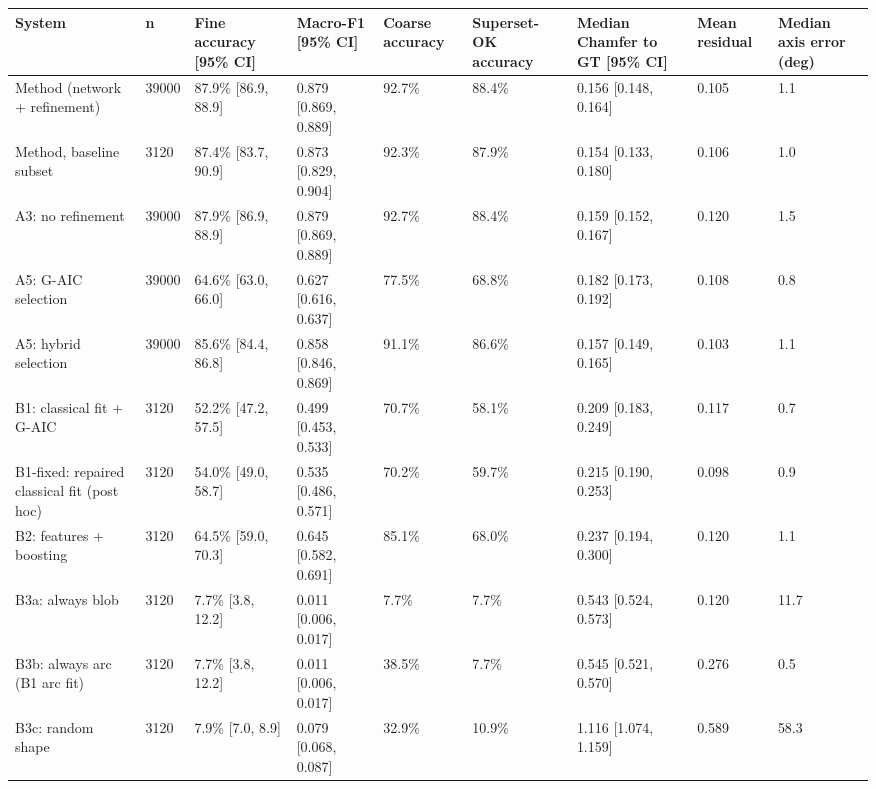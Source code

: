 \scriptsize
\begin{tabular}{lllllllll}
\toprule
\textbf{System} & \textbf{n} & \textbf{Fine accuracy [95\% CI]} & \textbf{Macro-F1 [95\% CI]} & \textbf{Coarse accuracy} & \textbf{Superset-OK accuracy} & \textbf{Median Chamfer to GT [95\% CI]} & \textbf{Mean residual} & \textbf{Median axis error (deg)} \\
\midrule
Method (network + refinement) & 39000 & 87.9\% [86.9, 88.9] & 0.879 [0.869, 0.889] & 92.7\% & 88.4\% & 0.156 [0.148, 0.164] & 0.105 & 1.1 \\
Method, baseline subset & 3120 & 87.4\% [83.7, 90.9] & 0.873 [0.829, 0.904] & 92.3\% & 87.9\% & 0.154 [0.133, 0.180] & 0.106 & 1.0 \\
A3: no refinement & 39000 & 87.9\% [86.9, 88.9] & 0.879 [0.869, 0.889] & 92.7\% & 88.4\% & 0.159 [0.152, 0.167] & 0.120 & 1.5 \\
A5: G-AIC selection & 39000 & 64.6\% [63.0, 66.0] & 0.627 [0.616, 0.637] & 77.5\% & 68.8\% & 0.182 [0.173, 0.192] & 0.108 & 0.8 \\
A5: hybrid selection & 39000 & 85.6\% [84.4, 86.8] & 0.858 [0.846, 0.869] & 91.1\% & 86.6\% & 0.157 [0.149, 0.165] & 0.103 & 1.1 \\
B1: classical fit + G-AIC & 3120 & 52.2\% [47.2, 57.5] & 0.499 [0.453, 0.533] & 70.7\% & 58.1\% & 0.209 [0.183, 0.249] & 0.117 & 0.7 \\
B1-fixed: repaired classical fit (post hoc) & 3120 & 54.0\% [49.0, 58.7] & 0.535 [0.486, 0.571] & 70.2\% & 59.7\% & 0.215 [0.190, 0.253] & 0.098 & 0.9 \\
B2: features + boosting & 3120 & 64.5\% [59.0, 70.3] & 0.645 [0.582, 0.691] & 85.1\% & 68.0\% & 0.237 [0.194, 0.300] & 0.120 & 1.1 \\
B3a: always blob & 3120 & 7.7\% [3.8, 12.2] & 0.011 [0.006, 0.017] & 7.7\% & 7.7\% & 0.543 [0.524, 0.573] & 0.120 & 11.7 \\
B3b: always arc (B1 arc fit) & 3120 & 7.7\% [3.8, 12.2] & 0.011 [0.006, 0.017] & 38.5\% & 7.7\% & 0.545 [0.521, 0.570] & 0.276 & 0.5 \\
B3c: random shape & 3120 & 7.9\% [7.0, 8.9] & 0.079 [0.068, 0.087] & 32.9\% & 10.9\% & 1.116 [1.074, 1.159] & 0.589 & 58.3 \\
\bottomrule
\end{tabular}
